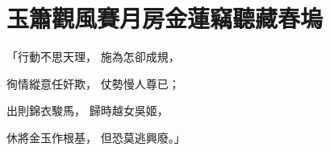 %

\chapter{玉簫觀風賽月房\KG 金蓮竊聽藏春塢}


\begin{showcontents}{}



「行動不思天理，   施為怎卻成規，

徇情縱意任奸欺，  仗勢慢人尊已；

出則錦衣駿馬，   歸時越女吳姬，

休將金玉作根基，  但恐莫逃興廢。」


\end{showcontents}
